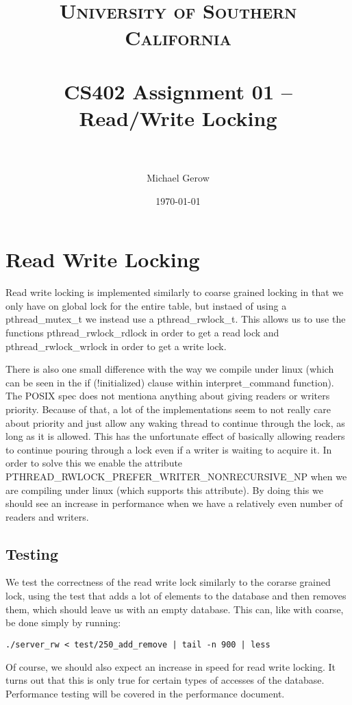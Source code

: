 \documentclass[paper=a4, fontsize=11pt]{scrartcl} %
\title{	
\normalfont \normalsize 
\textsc{University of Southern California} \\ [25pt] %
\horrule{0.5pt} \\[0.4cm] %
\huge CS402 Assignment 01 -- Read/Write Locking \\ %
\horrule{2pt} \\[0.5cm] %
}
\author{Michael Gerow} %
\date{\normalsize\today} %
\numberwithin{equation}{section} %
\numberwithin{figure}{section} %
\numberwithin{table}{section} %
\begin{document}
\maketitle %


\section{Read Write Locking}
Read write locking is implemented similarly to coarse grained locking in that we only have on global lock for the entire table, but instaed of using a pthread\_mutex\_t we instead use a pthread\_rwlock\_t. This allows us to use the functions pthread\_rwlock\_rdlock in order to get a read lock and pthread\_rwlock\_wrlock in order to get a write lock.

There is also one small difference with the way we compile under linux (which can be seen in the if (!initialized) clause within interpret\_command function).  The POSIX spec does not mentiona anything about giving readers or writers priority.  Because of that, a lot of the implementations seem to not really care about priority and just allow any waking thread to continue through the lock, as long as it is allowed.  This has the unfortunate effect of basically allowing readers to continue pouring through a lock even if a writer is waiting to acquire it.  In order to solve this we enable the attribute PTHREAD\_RWLOCK\_PREFER\_WRITER\_NONRECURSIVE\_NP when we are compiling under linux (which supports this attribute).  By doing this we should see an increase in performance when we have a relatively even number of readers and writers.

\subsection{Testing}
We test the correctness of the read write lock similarly to the corarse grained lock, using the test that adds a lot of elements to the database and then removes them, which should leave us with an empty database. This can, like with coarse, be done simply by running:

\begin{verbatim}
./server_rw < test/250_add_remove | tail -n 900 | less
\end{verbatim}

Of course, we should also expect an increase in speed for read write locking.  It turns out that this is only true for certain types of accesses of the database. Performance testing will be covered in the performance document.
\end{document}
